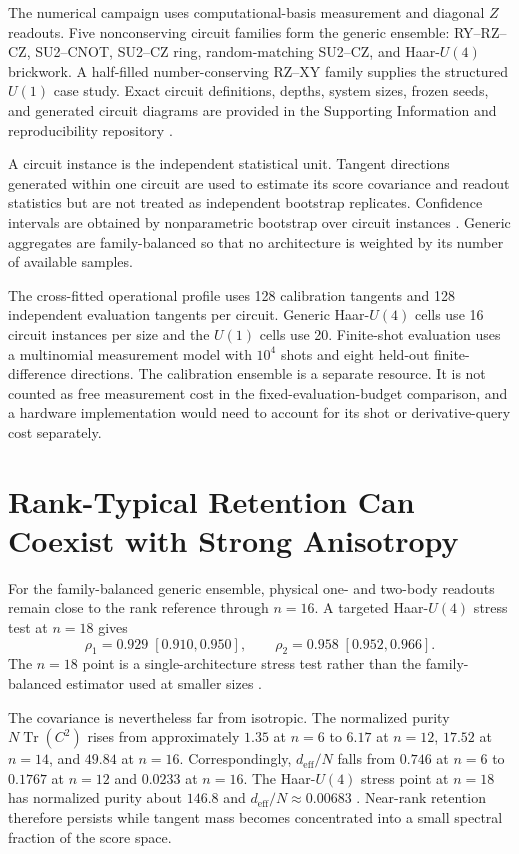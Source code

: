 The numerical campaign uses computational-basis measurement and diagonal $Z$ readouts. Five nonconserving circuit families form the generic ensemble: RY--RZ--CZ, SU2--CNOT, SU2--CZ ring, random-matching SU2--CZ, and Haar-$U(4)$ brickwork. A half-filled number-conserving RZ--XY family supplies the structured $U(1)$ case study. Exact circuit definitions, depths, system sizes, frozen seeds, and generated circuit diagrams are provided in the Supporting Information and reproducibility repository \cite{Bergholm2018,AitHaddou2026MeasurementAccessible}.

A circuit instance is the independent statistical unit. Tangent directions generated within one circuit are used to estimate its score covariance and readout statistics but are not treated as independent bootstrap replicates. Confidence intervals are obtained by nonparametric bootstrap over circuit instances \cite{Efron1979}. Generic aggregates are family-balanced so that no architecture is weighted by its number of available samples.

The cross-fitted operational profile uses 128 calibration tangents and 128 independent evaluation tangents per circuit. Generic Haar-$U(4)$ cells use 16 circuit instances per size and the $U(1)$ cells use 20. Finite-shot evaluation uses a multinomial measurement model with $10^4$ shots and eight held-out finite-difference directions. The calibration ensemble is a separate resource. It is not counted as free measurement cost in the fixed-evaluation-budget comparison, and a hardware implementation would need to account for its shot or derivative-query cost separately.

\section{Rank-Typical Retention Can Coexist with Strong Anisotropy}

For the family-balanced generic ensemble, physical one- and two-body readouts remain close to the rank reference through $n=16$. A targeted Haar-$U(4)$ stress test at $n=18$ gives
\begin{equation}
 \rho_1=0.929\;[0.910,0.950],
 \qquad
 \rho_2=0.958\;[0.952,0.966].
\label{eq:aqt-n18-rho}
\end{equation}
The $n=18$ point is a single-architecture stress test rather than the family-balanced estimator used at smaller sizes \cite{AitHaddou2026MeasurementAccessible}.

The covariance is nevertheless far from isotropic. The normalized purity $N\operatorname{Tr}(C^2)$ rises from approximately $1.35$ at $n=6$ to $6.17$ at $n=12$, $17.52$ at $n=14$, and $49.84$ at $n=16$. Correspondingly, $d_{\mathrm{eff}}/N$ falls from $0.746$ at $n=6$ to $0.1767$ at $n=12$ and $0.0233$ at $n=16$. The Haar-$U(4)$ stress point at $n=18$ has normalized purity about $146.8$ and $d_{\mathrm{eff}}/N\approx0.00683$ \cite{AitHaddou2026MeasurementAccessible}. Near-rank retention therefore persists while tangent mass becomes concentrated into a small spectral fraction of the score space.

